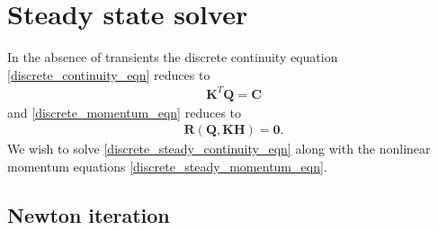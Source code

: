 \section{Steady state solver} \label{sec:steady_state} 

In the absence of transients the discrete continuity equation \eqref{discrete_continuity_eqn} reduces to 
\begin{align}\label{discrete_steady_continuity_eqn}
\boxed{\mathbf{K}^T \mathbf{Q} = \mathbf{C}}
\end{align} 
and \eqref{discrete_momentum_eqn} reduces to 
\begin{align}\label{discrete_steady_momentum_eqn}
\boxed{\mathbf{R}(\mathbf{Q}, \mathbf{K} \mathbf{H}) = \mathbf{0} .}
\end{align}
We wish to solve \eqref{discrete_steady_continuity_eqn} along with the nonlinear momentum equations \eqref{discrete_steady_momentum_eqn}.

\subsection{Newton iteration}

